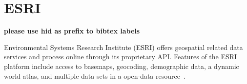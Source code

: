 \section{ESRI}

{\bf please use  hid as prefix to bibtex labels}

Environmental Systems Research Institute (ESRI) offers geospatial related data
services and process online through its proprietary API.  Features of the ESRI
platform include access to basemaps, geocoding, demographic data, a dynamic
world atlas, and multiple data sets in a open-data resource~\cite{ESRI2018}.
